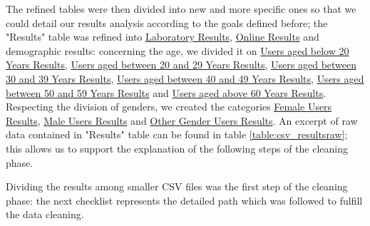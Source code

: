 %
The refined tables were then divided into new and more specific ones so that we could detail our results analysis according to the goals defined before;
the "Results" table was refined into \ul{Laboratory Results}, \ul{Online Results} and demographic results: concerning the age, we divided it
on \ul{Users aged below 20 Years Results}, \ul{Users aged between 20 and 29 Years Results}, \ul{Users aged between 30 and 39 Years Results},
\ul{Users aged between 40 and 49 Years Results}, \ul{Users aged between 50 and 59 Years Results} and \ul{Users aged above 60 Years Results}.
Respecting the division of genders, we created the categories \ul{Female Users Results}, \ul{Male Users Results} and \ul{Other Gender Users Results}.
An excerpt of raw data contained in "Results" table can be found in table \ref{table:csv_resultsraw}; this allows us to support the explanation of the
following steps of the cleaning phase. \par
%
Dividing the results among smaller \gls{CSV} files was the first step of the cleaning phase: the next checklist represents the detailed path which
was followed to fulfill the data cleaning.
%
